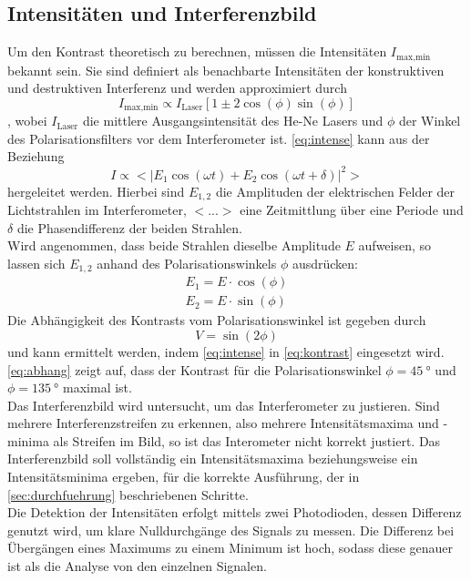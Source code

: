 \subsection{Intensitäten und Interferenzbild}
Um den Kontrast theoretisch zu berechnen, müssen die Intensitäten $I_{\text{max,min}}$ bekannt sein.
Sie sind definiert als benachbarte Intensitäten der konstruktiven und destruktiven Interferenz und werden approximiert durch
\begin{equation}
    I_{\text{max,min}} \propto I_{\text{Laser}}\left[1 \pm 2\cos\left(\phi\right)\sin\left(\phi\right)\right]
    \label{eq:intense}
\end{equation}
, wobei $I_{\text{Laser}}$ die mittlere Ausgangsintensität des He-Ne Lasers und $\phi$ der Winkel des Polarisationsfilters vor dem Interferometer ist.
\autoref{eq:intense} kann aus der Beziehung
\begin{equation}
    I \propto <|E_1\cos\left(\omega t\right) + E_2\cos\left(\omega t + \delta\right)|^2>
\end{equation}
hergeleitet werden.
Hierbei sind $E_{1,2}$ die Amplituden der elektrischen Felder der Lichtstrahlen im Interferometer, $<...>$ eine Zeitmittlung über eine Periode und $\delta$ die Phasendifferenz der beiden Strahlen.\\
Wird angenommen, dass beide Strahlen dieselbe Amplitude $E$ aufweisen, so lassen sich $E_{1,2}$ anhand des Polarisationswinkels $\phi$ ausdrücken:
\begin{align}
    E_1 = E\cdot \cos\left(\phi\right)\\
    E_2 = E\cdot \sin\left(\phi\right)
\end{align}
Die Abhängigkeit des Kontrasts vom Polarisationswinkel ist gegeben durch
\begin{equation}
    V = \sin\left(2\phi\right)
    \label{eq:abhang}
\end{equation}
und kann ermittelt werden, indem \autoref{eq:intense} in \autoref{eq:kontrast} eingesetzt wird.\\
\autoref{eq:abhang} zeigt auf, dass der Kontrast für die Polarisationswinkel $\phi = \SI{45}{\degree}$ und $\phi = \SI{135}{\degree}$ maximal ist.\\
\newline
Das Interferenzbild wird untersucht, um das Interferometer zu justieren.
Sind mehrere Interferenzstreifen zu erkennen, also mehrere Intensitätsmaxima und -minima als Streifen im Bild, so ist das Interometer nicht korrekt justiert.
Das Interferenzbild soll vollständig ein Intensitätsmaxima beziehungsweise ein Intensitätsminima ergeben, für die korrekte Ausführung, der in \autoref{sec:durchfuehrung} beschriebenen Schritte.\\
Die Detektion der Intensitäten erfolgt mittels zwei Photodioden, dessen Differenz genutzt wird, um klare Nulldurchgänge des Signals zu messen.
Die Differenz bei Übergängen eines Maximums zu einem Minimum ist hoch, sodass diese genauer ist als die Analyse von den einzelnen Signalen.

